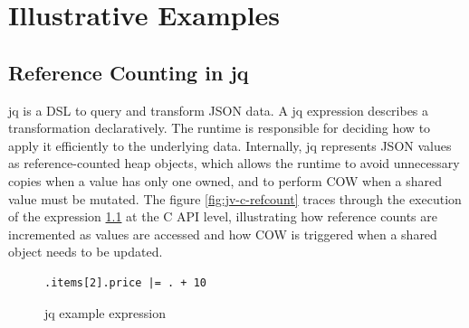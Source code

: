 \chapter{Illustrative Examples}

\section{Reference Counting in jq}
\label{sec:jq-refcount}

jq is a \acf{DSL} to query and transform JSON data. A jq expression describes a transformation declaratively. The runtime is responsible for deciding how to apply it efficiently to the underlying data. Internally, jq represents JSON values as reference-counted heap objects, which allows the runtime to avoid unnecessary copies when a value has only one owned, and to perform \acf{COW} when a shared value must be mutated. The figure \ref{fig:jv-c-refcount} traces through the execution of the expression \ref{fig:jq-example-expression} at the C API level, illustrating how reference counts are incremented as values are accessed and how \ac{COW} is triggered when a shared object needs to be updated.

\begin{figure}[H]
\begin{lstlisting}
.items[2].price |= . + 10
\end{lstlisting}
    \caption{jq example expression}
    \label{fig:jq-example-expression}
\end{figure}

